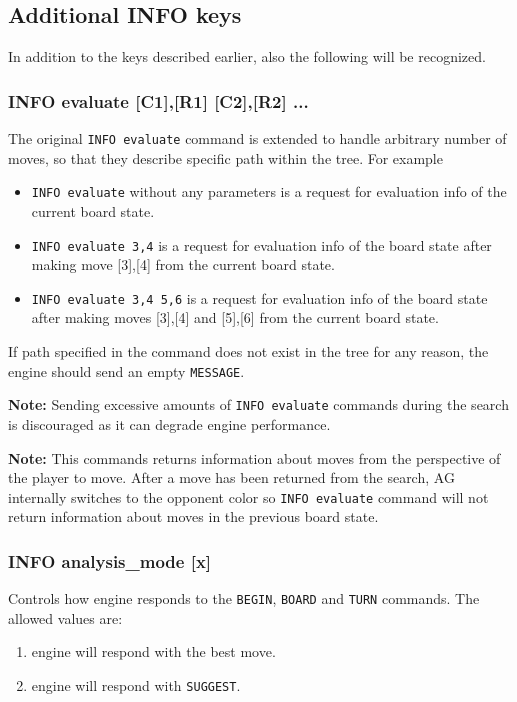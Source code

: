 \documentclass[12pt,a4paper]{article}
\begin{document}
\subsection{Additional INFO keys}
\label{cmd_info_extension1}
In addition to the keys described earlier, also the following will be recognized.

\subsubsection{INFO evaluate [C1],[R1] [C2],[R2] ...}
The original \texttt{INFO evaluate} command is extended to handle arbitrary number of moves, so that they describe specific path within the tree. For example 
\begin{itemize}
\item{\texttt{INFO evaluate} without any parameters is a request for evaluation info of the current board state.}
\item{\texttt{INFO evaluate 3,4} is a request for evaluation info of the board state after making move [3],[4] from the current board state.}
\item{\texttt{INFO evaluate 3,4 5,6} is a request for evaluation info of the board state after making moves [3],[4] and [5],[6] from the current board state.}
\end{itemize}
If path specified in the command does not exist in the tree for any reason, the engine should send an empty \texttt{MESSAGE}.

\textbf{Note:} Sending excessive amounts of \texttt{INFO evaluate} commands during the search is discouraged as it can degrade engine performance.

\textbf{Note:} This commands returns information about moves from the perspective of the player to move. After a move has been returned from the search, AG internally switches to the opponent color so \texttt{INFO evaluate} command will not return information about moves in the previous board state.

\subsubsection{INFO analysis{\_}mode [x]}
Controls how engine responds to the \texttt{BEGIN}, \texttt{BOARD} and \texttt{TURN} commands. The allowed values are:
\begin{enumerate}[leftmargin=7.5em]
	\item[\text{$[x]=0$}]{engine will respond with the best move.}
	\item[\text{$[x]=1$}]{engine will respond with \texttt{SUGGEST}.}
\end{enumerate}
\end{document}
